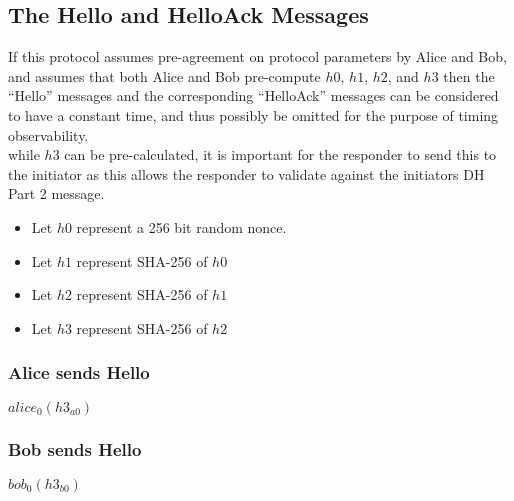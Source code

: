 \documentclass[11pt]{article}
\begin{document}
  \subsection{The Hello and HelloAck Messages}
  If this protocol assumes pre-agreement on protocol parameters
  by Alice and Bob, and assumes that both Alice and Bob pre-compute
  $h0$, $h1$, $h2$, and $h3$ then the ``Hello'' messages and the 
  corresponding ``HelloAck'' messages can be considered to have
  a constant time, and thus possibly be omitted for the purpose of
  timing observability. \\
  while $h3$ can be pre-calculated, it is important for the responder
  to send this to the initiator as this allows the responder to validate
  against the initiators DH Part 2 message.
  \begin{itemize}
    \item Let $h0$ represent a 256 bit random nonce.
    \item Let $h1$ represent SHA-256 of $h0$
    \item Let $h2$ represent SHA-256 of $h1$
    \item Let $h3$ represent SHA-256 of $h2$
  \end{itemize}
  \subsubsection{Alice sends Hello}
  $alice_0(h3_{a0})$
  \subsubsection{Bob sends Hello}
  $bob_0(h3_{b0})$
\end{document}
